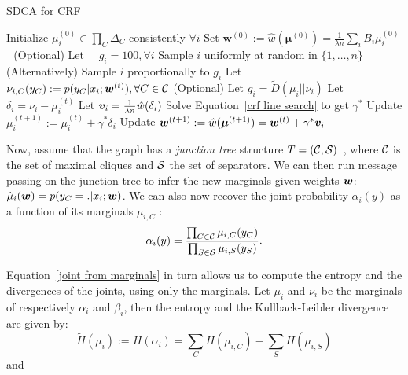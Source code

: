 \begin{algorithm}[t]
    \caption{SDCA for CRF}%
    \label{sdca for crf}
	\begin{algorithmic}
        \STATE Initialize $\mu_{i}^{(0)} \in \prod_C \Delta_{C}$ consistently $\forall i$ 
        \STATE Set $\bm{w}^{(0)}  :=  \hat{w}(\bm\mu^{(0)}) = \frac{1}{\lambda n} \sum_i B_i \mu_i^{(0)}$ \,\, 
        \STATE (Optional) Let $\quad g_i = 100, \forall i $
                \STATE Sample $i$ uniformly at random in $\{1,\ldots,n\}$
                \STATE (Alternatively)  Sample $i$ proportionally to $g_i$
                \STATE Let $\nu_{i, C} (y_C) := p(y_C | x_i; \boldsymbol{w}^{(t)}), \forall C\in{\mathcal C}$  
                \STATE (Optional) Let $g_i = \tilde D(\mu_i || \nu_i)$  
                \STATE Let $\delta_i = \nu_i - \mu_i^{(t)}$ 
                \STATE Let $\bm v_i = \frac{1}{\lambda n} \hat w(\delta_i)$ 
                \STATE Solve Equation~\eqref{crf line search} to get $\gamma^*$  
               \STATE Update $\mu_i^{(t+1)} := \mu_i^{(t)} + \gamma^* \delta_i$
               \STATE Update $\bm{w}^{(t+1)} := \hat{w}(\bm\mu^{(t+1)}) = \bm{w}^{(t)} + \gamma^* \bm v_i $
        \ENDFOR
	\end{algorithmic}
\end{algorithm}

Now, assume that the graph has a {\it junction tree} structure $T=({\mathcal C},{\mathcal S})$~\citep[Def.~10.3]{koller2009PGM}, where ${\mathcal C}$ is the set of maximal cliques and ${\mathcal S}$ the set of separators.
We can then run message passing on the junction tree to infer the new marginals given weights $\boldsymbol{w}$: $\hat \mu_i(\bm w) = {p(y_C=. | x_i ;\boldsymbol{w})}$.
We can also now recover the joint probability $\alpha_i(y)$ as a function of its marginals $\mu_{i, C}$ \citep[Def.~10.6]{koller2009PGM}:
\begin{equation}
	\label{joint from marginals}
	\alpha_i(y) = \frac{\prod_{C\in{\mathcal C}} \mu_{i, C} (y_C)}{\prod_{S \in{\mathcal S}} \mu_{i, S}(y_S)}.
\end{equation}


Equation~\eqref{joint from marginals} in turn allows us to compute the entropy and the divergences of the joints, using only the marginals. Let $\mu_i$ and $\nu_i$ be the marginals of respectively $\alpha_i$ and $\beta_i$, then the entropy and the Kullback-Leibler divergence are given by:
\begin{equation}
	\label{entropy marginal}
	\tilde H (\mu_i)
	:= H (\alpha_i)
	= \sum_C H(\mu_{i, C}) - \sum_S H(\mu_{i, S})
\end{equation}
and

